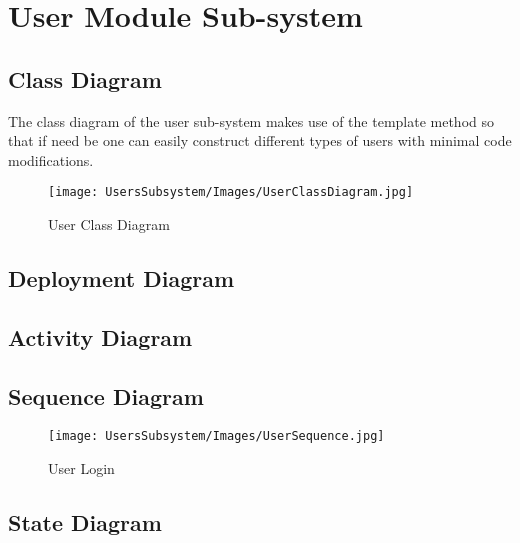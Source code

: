 

\section{User Module Sub-system}
\subsection{Class Diagram}
The class diagram of the user sub-system makes use of the template method so that if need be one can easily construct different types of users with minimal code modifications.


\begin{figure}[H]
	\centering
	\texttt{[image: UsersSubsystem/Images/UserClassDiagram.jpg]}
	\caption{User Class Diagram}
\end{figure}



\subsection{Deployment Diagram}

\begin{figure}[H]
\end{figure}


\subsection{Activity Diagram}

\begin{figure}[H]
\end{figure}


\subsection{Sequence Diagram}

\begin{figure}[H]
		\centering
		\texttt{[image: UsersSubsystem/Images/UserSequence.jpg]}
		\caption{User Login}
\end{figure}



\subsection{State Diagram}

